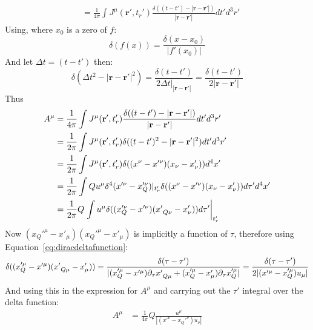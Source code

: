 \documentclass[12pt,a4]{article}
\begin{document}
\begin{enumerate}
\begin{enumerate}
\begin{align*}
                &= \frac{1}{4 \pi}\int J^\mu (\mathbf{r}', t_r') \frac{\delta((t - t') - |\mathbf{r} - \mathbf{r}'|)}{|\mathbf{r} - \mathbf{r}'|}dt' d^3 r'
        \end{align*}
        Using, where $x_0$ is a zero of $f$:
        \begin{equation}
          \delta(f(x)) = \frac{\delta(x - x_0)}{|f'(x_0)|}
          \label{eq:diracdeltafunction}
        \end{equation}
        And let $\Delta t = (t - t')$ then:
        \begin{equation*}
          \delta(\Delta t^2 - |\mathbf{r} - \mathbf{r}'|^2) = \frac{\delta(t - t')}{2 \Delta t |_{|\mathbf{r} - \mathbf{r}'|}} = \frac{\delta(t - t')}{2 |\mathbf{r} - \mathbf{r}'|}
        \end{equation*}
        Thus
        \begin{align*}
          A^\mu &=\frac{1}{4 \pi}\int J^\mu (\mathbf{r}', t_r') \frac{\delta((t - t') - |\mathbf{r} - \mathbf{r}'|)}{|\mathbf{r} - \mathbf{r}'|}dt' d^3 r'\\
                &=\frac{1}{2 \pi}\int J^\mu (\mathbf{r}', t_r') \delta((t - t')^2 - |\mathbf{r} - \mathbf{r}'|^2)dt' d^3 r'\\
                &=\frac{1}{2 \pi}\int J^\mu (\mathbf{r}', t_r') \delta((x^\nu - x'^\nu)(x_\nu - x'_\nu))d^4x'\\
                &=\frac{1}{2 \pi}\int Q u^\mu \delta^4(x'^\nu - x_Q'^\nu)|_{t'_r} \delta((x^\nu - x'^\nu)(x_\nu - x'_\nu))d \tau' d^4x' \\
                &=\frac{1}{2 \pi}Q \left.\int  u^\mu \delta((x_Q'^\nu - x'^\nu)(x'\tensor{}{_Q_\nu} - x'_\nu)) d \tau' \right|_{t'_r}
        \end{align*}
        Now $(x_Q'^\mu - x'_\mu)(x_Q'^\mu - x'_\mu)$ is implicitly a function of $\tau$, therefore using Equation~\ref{eq:diracdeltafunction}:
        \begin{align*}
          \delta((x_Q'^\mu - x'^\mu)(x'\tensor{}{_Q_\mu} - x'_\mu)) = \frac{\delta(\tau - \tau')}{|(x_Q'^\mu - x'^\mu)\partial_\tau x'\tensor{}{_Q_\mu} + (x_Q'^\mu - x'_\mu)\partial_\tau x_Q'^\mu|} = \frac{\delta(\tau - \tau')}{2|(x'^\mu - x_Q'^\mu)u_\mu|}
        \end{align*}
        And using this in the expression for $A^\mu$ and carrying out the $\tau '$ integral over the delta function:
        \begin{align*}
          A^\mu &=\frac{1}{4 \pi}Q \frac{u^\mu}{|(x'^\nu - x_Q'^\nu)u_\nu|}
        \end{align*}

\end{enumerate}
\end{enumerate}
\end{document}
